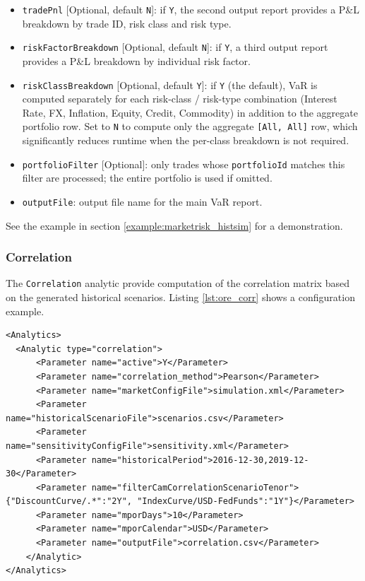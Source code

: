 \begin{itemize}
  the analytic uses the existing full-revaluation path.
\item {\tt tradePnl} [Optional, default {\tt N}]: if {\tt Y}, the second output report provides a P\&L breakdown by
  trade ID, risk class and risk type.
\item {\tt riskFactorBreakdown} [Optional, default {\tt N}]: if {\tt Y}, a third output report provides a
  P\&L breakdown by individual risk factor.
\item {\tt riskClassBreakdown} [Optional, default {\tt Y}]: if {\tt Y} (the default), VaR is computed
  separately for each risk-class / risk-type combination (Interest Rate, FX, Inflation, Equity, Credit,
  Commodity) in addition to the aggregate portfolio row. Set to {\tt N} to compute only the aggregate
  {\tt [All, All]} row, which significantly reduces runtime when the per-class breakdown is not required.
\item {\tt portfolioFilter} [Optional]: only trades whose {\tt portfolioId} matches this filter are processed;
  the entire portfolio is used if omitted.
\item {\tt outputFile}: output file name for the main VaR report.
\end{itemize}

See the example in section \ref{example:marketrisk_histsim} for a demonstration.

\subsubsection{Correlation}

The {\tt Correlation} analytic provide computation of the correlation matrix based on the generated historical scenarios. Listing \ref{lst:ore_corr} shows a configuration example.

\begin{listing}[H]
\begin{verbatim}
<Analytics>
  <Analytic type="correlation">
      <Parameter name="active">Y</Parameter>
      <Parameter name="correlation_method">Pearson</Parameter>
      <Parameter name="marketConfigFile">simulation.xml</Parameter>
      <Parameter name="historicalScenarioFile">scenarios.csv</Parameter>
      <Parameter name="sensitivityConfigFile">sensitivity.xml</Parameter>
      <Parameter name="historicalPeriod">2016-12-30,2019-12-30</Parameter>
      <Parameter name="filterCamCorrelationScenarioTenor">{"DiscountCurve/.*":"2Y", "IndexCurve/USD-FedFunds":"1Y"}</Parameter>
      <Parameter name="mporDays">10</Parameter>
      <Parameter name="mporCalendar">USD</Parameter>
      <Parameter name="outputFile">correlation.csv</Parameter>
    </Analytic>
</Analytics>
\end{verbatim}
\caption{ORE analytic: Correlation}
\label{lst:ore_corr}
\end{listing}

